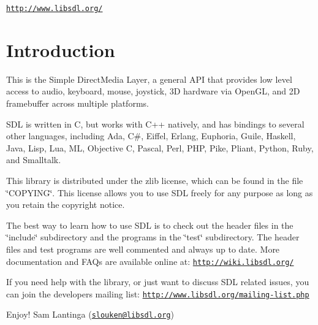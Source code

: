 \href{http://www.libsdl.org/}{\tt http\-://www.\-libsdl.\-org/}\hypertarget{index_intro_sec}{}\section{Introduction}\label{index_intro_sec}
This is the Simple Direct\-Media Layer, a general A\-P\-I that provides low level access to audio, keyboard, mouse, joystick, 3\-D hardware via Open\-G\-L, and 2\-D framebuffer across multiple platforms.

S\-D\-L is written in C, but works with C++ natively, and has bindings to several other languages, including Ada, C\#, Eiffel, Erlang, Euphoria, Guile, Haskell, Java, Lisp, Lua, M\-L, Objective C, Pascal, Perl, P\-H\-P, Pike, Pliant, Python, Ruby, and Smalltalk.

This library is distributed under the zlib license, which can be found in the file \char`\"{}\-C\-O\-P\-Y\-I\-N\-G\char`\"{}. This license allows you to use S\-D\-L freely for any purpose as long as you retain the copyright notice.

The best way to learn how to use S\-D\-L is to check out the header files in the \char`\"{}include\char`\"{} subdirectory and the programs in the \char`\"{}test\char`\"{} subdirectory. The header files and test programs are well commented and always up to date. More documentation and F\-A\-Qs are available online at\-: \href{http://wiki.libsdl.org/}{\tt http\-://wiki.\-libsdl.\-org/}

If you need help with the library, or just want to discuss S\-D\-L related issues, you can join the developers mailing list\-: \href{http://www.libsdl.org/mailing-list.php}{\tt http\-://www.\-libsdl.\-org/mailing-\/list.\-php}

Enjoy! Sam Lantinga (\href{mailto:slouken@libsdl.org}{\tt slouken@libsdl.\-org}) 